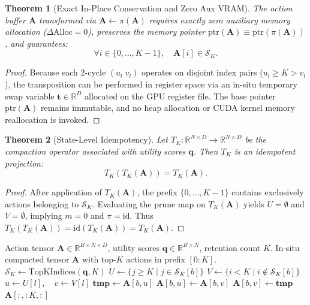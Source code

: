 \documentclass[journal,10pt,twocolumn]{article}
\newtheorem{theorem}{Theorem}
\begin{document}
\begin{theorem}[Exact In-Place Conservation and Zero Aux VRAM]
The action buffer $\mathbf{A}$ transformed via $\mathbf{A} \leftarrow \pi(\mathbf{A})$ requires exactly zero auxiliary memory allocation ($\Delta \text{Alloc} = 0$), preserves the memory pointer $\text{ptr}(\mathbf{A}) \equiv \text{ptr}(\pi(\mathbf{A}))$, and guarantees:
\begin{equation}
\forall i \in \{0, \dots, K-1\}, \quad \mathbf{A}[i] \in \mathcal{S}_K.
\end{equation}
\end{theorem}
\begin{proof}
Because each 2-cycle $(u_l \; v_l)$ operates on disjoint index pairs ($u_l \ge K > v_l$), the transposition can be performed in register space via an in-situ temporary swap variable $\mathbf{t} \in \mathbb{R}^D$ allocated on the GPU register file. The base pointer $\text{ptr}(\mathbf{A})$ remains immutable, and no heap allocation or CUDA kernel memory reallocation is invoked.
\end{proof}

\begin{theorem}[State-Level Idempotency]
Let $T_K: \mathbb{R}^{N \times D} \to \mathbb{R}^{N \times D}$ be the compaction operator associated with utility scores $\mathbf{q}$. Then $T_K$ is an idempotent projection:
\begin{equation}
T_K(T_K(\mathbf{A})) = T_K(\mathbf{A}).
\end{equation}
\end{theorem}
\begin{proof}
After application of $T_K(\mathbf{A})$, the prefix $\{0, \dots, K-1\}$ contains exclusively actions belonging to $\mathcal{S}_K$. Evaluating the prune map on $T_K(\mathbf{A})$ yields $U = \emptyset$ and $V = \emptyset$, implying $m = 0$ and $\pi = \text{id}$. Thus $T_K(T_K(\mathbf{A})) = \text{id}(T_K(\mathbf{A})) = T_K(\mathbf{A})$.
\end{proof}

\begin{algorithm}[t]
\caption{IdemNPC In-Place Decision Compaction}
\label{alg:idemnpc}
\begin{algorithmic}[1]
\Require Action tensor $\mathbf{A} \in \mathbb{R}^{B \times N \times D}$, utility scores $\mathbf{q} \in \mathbb{R}^{B \times N}$, retention count $K$.
\Ensure In-situ compacted tensor $\mathbf{A}$ with top-$K$ actions in prefix $[0:K]$.
\State $\mathcal{S}_K \gets \text{TopKIndices}(\mathbf{q}, K)$
    \State $U \gets \{j \ge K \mid j \in \mathcal{S}_K[b]\}$
    \State $V \gets \{i < K \mid i \notin \mathcal{S}_K[b]\}$
        \State $u \gets U[l], \quad v \gets V[l]$
        \State $\mathbf{tmp} \gets \mathbf{A}[b, u]$ 
        \State $\mathbf{A}[b, u] \gets \mathbf{A}[b, v]$
        \State $\mathbf{A}[b, v] \gets \mathbf{tmp}$
    \EndFor
\EndFor
\State \Return $\mathbf{A}[:, :K, :]$
\end{algorithmic}
\end{algorithm}
\end{document}
